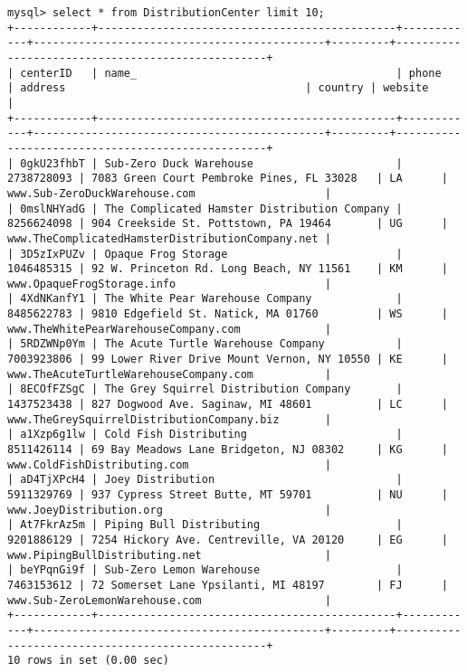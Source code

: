 \documentclass[american,extrafontsizes,12pt,portrait,letterpaper,oneside,onecolumn,article,final]{memoir}
\begin{document}
\begin{verbatim}
mysql> select * from DistributionCenter limit 10;
+------------+----------------------------------------------+------------+---------------------------------------------+---------+--------------------------------------------------+
| centerID   | name_                                        | phone      | address                                     | country | website                                          |
+------------+----------------------------------------------+------------+---------------------------------------------+---------+--------------------------------------------------+
| 0gkU23fhbT | Sub-Zero Duck Warehouse                      | 2738728093 | 7083 Green Court Pembroke Pines, FL 33028   | LA      | www.Sub-ZeroDuckWarehouse.com                    |
| 0mslNHYadG | The Complicated Hamster Distribution Company | 8256624098 | 904 Creekside St. Pottstown, PA 19464       | UG      | www.TheComplicatedHamsterDistributionCompany.net |
| 3D5zIxPUZv | Opaque Frog Storage                          | 1046485315 | 92 W. Princeton Rd. Long Beach, NY 11561    | KM      | www.OpaqueFrogStorage.info                       |
| 4XdNKanfY1 | The White Pear Warehouse Company             | 8485622783 | 9810 Edgefield St. Natick, MA 01760         | WS      | www.TheWhitePearWarehouseCompany.com             |
| 5RDZWNp0Ym | The Acute Turtle Warehouse Company           | 7003923806 | 99 Lower River Drive Mount Vernon, NY 10550 | KE      | www.TheAcuteTurtleWarehouseCompany.com           |
| 8ECOfFZSgC | The Grey Squirrel Distribution Company       | 1437523438 | 827 Dogwood Ave. Saginaw, MI 48601          | LC      | www.TheGreySquirrelDistributionCompany.biz       |
| a1Xzp6g1lw | Cold Fish Distributing                       | 8511426114 | 69 Bay Meadows Lane Bridgeton, NJ 08302     | KG      | www.ColdFishDistributing.com                     |
| aD4TjXPcH4 | Joey Distribution                            | 5911329769 | 937 Cypress Street Butte, MT 59701          | NU      | www.JoeyDistribution.org                         |
| At7FkrAz5m | Piping Bull Distributing                     | 9201886129 | 7254 Hickory Ave. Centreville, VA 20120     | EG      | www.PipingBullDistributing.net                   |
| beYPqnGi9f | Sub-Zero Lemon Warehouse                     | 7463153612 | 72 Somerset Lane Ypsilanti, MI 48197        | FJ      | www.Sub-ZeroLemonWarehouse.com                   |
+------------+----------------------------------------------+------------+---------------------------------------------+---------+--------------------------------------------------+
10 rows in set (0.00 sec)


\end{verbatim}
\end{document}
